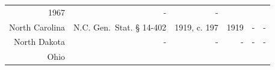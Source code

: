 \documentclass[]{article}
\begin{document}
\begin{longtable}[c]{@{}rrrrrr@{}}
\begin{minipage}[t]{0.10\columnwidth}
1967
\strut\end{minipage} &
\begin{minipage}[t]{0.10\columnwidth}\raggedleft\strut
-
\strut\end{minipage} &
\begin{minipage}[t]{0.10\columnwidth}\raggedleft\strut
-
\strut\end{minipage}\tabularnewline
\begin{minipage}[t]{0.10\columnwidth}\raggedleft\strut
North Carolina
\strut\end{minipage} &
\begin{minipage}[t]{0.21\columnwidth}\raggedleft\strut
N.C. Gen.~Stat. § 14-402
\strut\end{minipage} &
\begin{minipage}[t]{0.22\columnwidth}\raggedleft\strut
1919, c. 197
\strut\end{minipage} &
\begin{minipage}[t]{0.10\columnwidth}\raggedleft\strut
1919
\strut\end{minipage} &
\begin{minipage}[t]{0.10\columnwidth}\raggedleft\strut
-
\strut\end{minipage} &
\begin{minipage}[t]{0.10\columnwidth}\raggedleft\strut
-
\strut\end{minipage}\tabularnewline
\begin{minipage}[t]{0.10\columnwidth}\raggedleft\strut
North Dakota
\strut\end{minipage} &
\begin{minipage}[t]{0.21\columnwidth}\raggedleft\strut
-
\strut\end{minipage} &
\begin{minipage}[t]{0.22\columnwidth}\raggedleft\strut
-
\strut\end{minipage} &
\begin{minipage}[t]{0.10\columnwidth}\raggedleft\strut
-
\strut\end{minipage} &
\begin{minipage}[t]{0.10\columnwidth}\raggedleft\strut
-
\strut\end{minipage} &
\begin{minipage}[t]{0.10\columnwidth}\raggedleft\strut
-
\strut\end{minipage}\tabularnewline
\begin{minipage}[t]{0.10\columnwidth}\raggedleft\strut
Ohio
\strut\end{minipage} &
\begin{minipage}[t]{0.21\columnwidth}\raggedleft\strut

\end{minipage}
\end{longtable}
\end{document}
